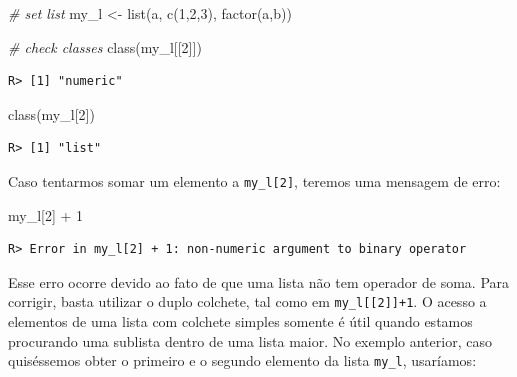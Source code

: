 \documentclass[
  11pt,
]{book}
\newenvironment{Shaded}{\begin{snugshade}}{\end{snugshade}}
\newcommand{\CommentTok}[1]{\textcolor[rgb]{0.37,0.37,0.37}{\textit{#1}}}
\newcommand{\DecValTok}[1]{\textcolor[rgb]{0.06,0.06,0.06}{#1}}
\newcommand{\FunctionTok}[1]{\textcolor[rgb]{0,0,0}{#1}}
\newcommand{\NormalTok}[1]{#1}
\newcommand{\OtherTok}[1]{\textcolor[rgb]{0.37,0.37,0.37}{#1}}
\newcommand{\SpecialCharTok}[1]{\textcolor[rgb]{0,0,0}{#1}}
\newcommand{\StringTok}[1]{\textcolor[rgb]{0.5,0.5,0.5}{#1}}
\begin{document}
\begin{Shaded}
\begin{Highlighting}[]
\CommentTok{\# set list}
\NormalTok{my\_l }\OtherTok{\textless{}{-}} \FunctionTok{list}\NormalTok{(}\StringTok{\textquotesingle{}a\textquotesingle{}}\NormalTok{,}
             \FunctionTok{c}\NormalTok{(}\DecValTok{1}\NormalTok{,}\DecValTok{2}\NormalTok{,}\DecValTok{3}\NormalTok{),}
             \FunctionTok{factor}\NormalTok{(}\StringTok{\textquotesingle{}a\textquotesingle{}}\NormalTok{,}\StringTok{\textquotesingle{}b\textquotesingle{}}\NormalTok{))}

\CommentTok{\# check classes}
\FunctionTok{class}\NormalTok{(my\_l[[}\DecValTok{2}\NormalTok{]])}
\end{Highlighting}
\end{Shaded}

\begin{verbatim}
R> [1] "numeric"
\end{verbatim}

\begin{Shaded}
\begin{Highlighting}[]
\FunctionTok{class}\NormalTok{(my\_l[}\DecValTok{2}\NormalTok{])}
\end{Highlighting}
\end{Shaded}

\begin{verbatim}
R> [1] "list"
\end{verbatim}

Caso tentarmos somar um elemento a \texttt{my\_l{[}2{]}}, teremos uma mensagem de erro:

\begin{Shaded}
\begin{Highlighting}[]
\NormalTok{my\_l[}\DecValTok{2}\NormalTok{] }\SpecialCharTok{+} \DecValTok{1}
\end{Highlighting}
\end{Shaded}

\begin{verbatim}
R> Error in my_l[2] + 1: non-numeric argument to binary operator
\end{verbatim}

Esse erro ocorre devido ao fato de que uma lista não tem operador de soma. Para corrigir, basta utilizar o duplo colchete, tal como em \texttt{my\_l{[}{[}2{]}{]}+1}. O acesso a elementos de uma lista com colchete simples somente é útil quando estamos procurando uma sublista dentro de uma lista maior. No exemplo anterior, caso quiséssemos obter o primeiro e o segundo elemento da lista \texttt{my\_l}, usaríamos:
\end{document}

